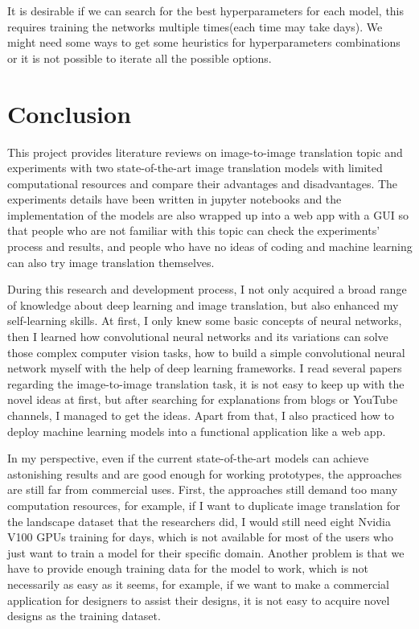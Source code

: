 \begin{itemize}
    It is desirable if we can search for the best hyperparameters for each model, this requires 
    training the networks multiple times(each time may take days). We might need some ways to 
    get some heuristics for hyperparameters combinations or it is not possible to iterate all 
    the possible options.
\end{itemize}

\section{Conclusion}
This project provides literature reviews on image-to-image translation topic
and experiments with two state-of-the-art image translation 
models with limited computational resources and compare their advantages and 
disadvantages. The experiments details have been written in jupyter notebooks 
and the implementation of the models are also wrapped up into a web app 
with a GUI so that people who are not familiar 
with this topic can check the experiments' process and results, and people
who have no ideas of coding and machine learning can also try image translation themselves.  

During this research and development process, I not only acquired a broad range of knowledge 
about deep learning and image translation, but also enhanced my self-learning skills. 
At first, I only knew some basic concepts of neural networks, then I learned how convolutional 
neural networks and its variations can solve those complex computer vision tasks, how to build a 
simple convolutional neural network myself with the help of deep learning frameworks. I read 
several papers regarding the image-to-image translation task, it is not easy to keep up with the 
novel ideas at first, but after searching for explanations from blogs or YouTube channels, I 
managed to get the ideas. Apart from that, I also practiced how to deploy machine learning 
models into a functional application like a web app.

In my perspective, even if the current state-of-the-art models can achieve 
astonishing results and are good enough for working prototypes, 
the approaches are still far from commercial uses.
First, the approaches still demand too many computation resources,
for example, if I want to duplicate image translation for the landscape dataset 
that the researchers did, I would still need eight Nvidia V100 GPUs training for days, which is not 
available for most of the users who just want to train a model for their specific domain. 
Another problem is that we have to provide enough training data for the model to work,
which is not necessarily as easy as it seems, for example, 
if we want to make a commercial application for designers to assist their designs, 
it is not easy to acquire novel designs as the training dataset.